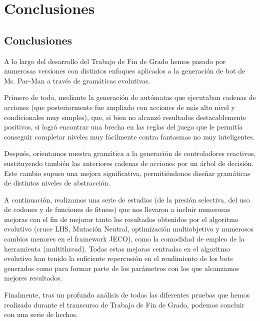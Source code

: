 \chapter{Conclusiones} \label{cap:conclusiones}

\section{Conclusiones}
A lo largo del desarrollo del Trabajo de Fin de Grado hemos pasado por numerosas versiones con distintos enfoques aplicados a la generación de bot de Ms. Pac-Man a través de gramáticas evolutivas. 
 
Primero de todo, mediante la generación de autómatas que ejecutaban cadenas de acciones (que posteriormente fue ampliado con acciones de más alto nivel y condicionales muy simples), que, si bien no alcanzó resultados destacablemente positivos, si logró encontrar una brecha en las reglas del juego que le permitía conseguir completar niveles muy fácilmente contra fantasmas no muy inteligentes.
 
Después, orientamos nuestra gramática a la generación de controladores reactivos, sustituyendo también las anteriores cadenas de acciones por un árbol de decisión. Este cambio supuso una mejora significativa, permitiéndonos diseñar gramáticas de distintos niveles de abstracción.
 
A continuación, realizamos una serie de estudios (de la presión selectiva, del uso de codones y de funciones de fitness) que nos llevaron a incluir numerosas mejoras con el fin de mejorar tanto los resultados obtenidos por el algoritmo evolutivo (cruce LHS, Mutación Neutral, optimización multiobjetivo y numerosos cambios menores en el framework JECO), como la comodidad de empleo de la herramienta (multithread). Todas estas mejoras centradas en el algoritmo evolutivo han tenido la suficiente repercusión en el rendimiento de los bots generados como para formar parte de los parámetros con los que alcanzamos mejores resultados.
 
Finalmente, tras un profundo análisis de todas las diferentes pruebas que hemos realizado durante el transcurso de Trabajo de Fin de Grado, podemos concluir con una serie de hechos. 
 
